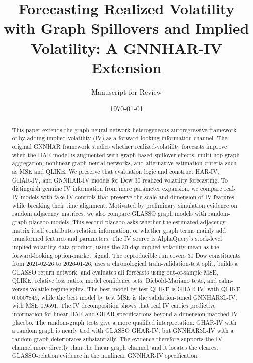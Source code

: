 \documentclass[11pt,a4paper]{article}
\title{\textbf{Forecasting Realized Volatility with Graph Spillovers and Implied Volatility: A GNNHAR-IV Extension}}
\author{Manuscript for Review}
\date{\today}
\begin{document}
\maketitle

\begin{abstract}
This paper extends the graph neural network heterogeneous autoregressive framework of
\citet{zhang2025gnnhar} by adding implied volatility (IV) as a forward-looking information
channel. The original GNNHAR framework studies whether realized-volatility forecasts improve
when the HAR model is augmented with graph-based spillover effects, multi-hop graph
aggregation, nonlinear graph neural networks, and alternative estimation criteria such as
MSE and QLIKE. We preserve that evaluation logic and construct HAR-IV, GHAR-IV, and
GNNHAR-IV models for Dow 30 realized volatility forecasting. To distinguish genuine IV
information from mere parameter expansion, we compare real-IV models with fake-IV controls
that preserve the scale and dimension of IV features while breaking their time alignment.
Motivated by preliminary simulation evidence on random adjacency matrices, we also compare
GLASSO graph models with random-graph placebo models. This second placebo asks whether
the estimated adjacency matrix itself contributes relation information, or whether graph terms
mainly add transformed features and parameters.
The IV source is AlphaQuery's stock-level implied-volatility data product, using the
30-day implied-volatility mean as the forward-looking option-market signal. The reproducible run
covers 30 Dow constituents from 2021-02-26 to 2026-01-26, uses a chronological
train-validation-test split, builds a GLASSO return network, and evaluates all forecasts using
out-of-sample MSE, QLIKE, relative loss ratios, model confidence sets, Diebold-Mariano tests,
and calm-versus-volatile regime splits. The best model by test QLIKE is
GHAR-IV, with QLIKE \(0.0007849\), while the best model by test MSE is the
validation-tuned GNNHAR3L-IV, with MSE \(0.9591\). The IV decomposition shows that real
IV carries predictive information for linear HAR and GHAR specifications beyond a
dimension-matched IV placebo. The random-graph tests give a more qualified interpretation:
GHAR-IV with a random graph is nearly tied with GLASSO GHAR-IV, but GNNHAR3L-IV with a
random graph deteriorates substantially. The evidence therefore supports the IV channel more
directly than the linear graph channel, and it locates the clearest GLASSO-relation evidence in
the nonlinear GNNHAR-IV specification.
\end{abstract}
\end{document}
